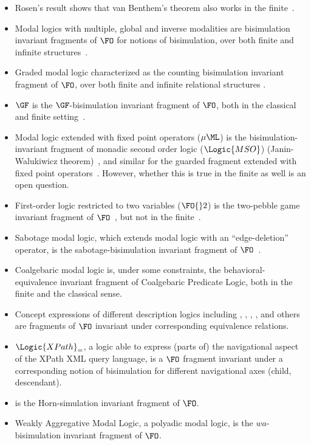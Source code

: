 \begin{itemize}
  \item Rosen's result shows that van Benthem's theorem also works in the finite~\cite{Rosen97}.
  \item Modal logics with multiple, global and inverse modalities are bisimulation invariant fragments of $\FO$ for notions of bisimulation, over both finite and infinite structures~\cite{Otto04}.
  \item Graded modal logic characterized as the counting bisimulation invariant fragment of $\FO$, over both finite and infinite relational structures \cite{derijke2000,otto2023}.
  \item $\GF$ is the $\GF$-bisimulation invariant fragment of $\FO$, both in the classical~\cite{AndrekaNB98} and finite setting~\cite{Otto2012}.
  \item Modal logic extended with fixed point operators ($\mu\ML$) is the bisimulation-invariant fragment of monadic second order logic ($\Logic{MSO}$) (Janin-Walukiwicz theorem)~\cite{janin1996}, and similar for the guarded fragment extended with fixed point operators~\cite{gradel2002}.
        However, whether this is true in the finite as well is an open question.
  \item First-order logic restricted to two variables ($\FO{}2$) is the two-pebble game invariant fragment of $\FO$~\cite{gradel1999}, but not in the finite~\cite{otto2017}.
  \item Sabotage modal logic, which extends modal logic with an ``edge-deletion'' operator, is the sabotage-bisimulation invariant fragment of $\FO$~\cite{aucher2015}.
  \item Coalgebaric modal logic is, under some constraints, the behavioral-equivalence invariant fragment of Coalgebaric Predicate Logic\cite{litak2012}, both in the finite and the classical sense.
  \item Concept expressions of different description logics including , , , ,  and others are fragments of $\FO$ invariant under corresponding equivalence relations\cite{kurtonina1999, lutz2011, piro2013}.
  \item $\Logic{XPath}_{=}$, a logic able to express (parts of) the navigational aspect of the XPath XML query language, is a $\FO$ fragment invariant under a corresponding notion of bisimulation for different navigational axes (child, descendant)\cite{figueira2015}.
  \item {} is the Horn-simulation invariant fragment of $\FO$\cite{jung2019}.
  \item Weakly Aggregative Modal Logic, a polyadic modal logic, is the $wa$-bisimulation invariant fragment of $\FO$.
\end{itemize}

